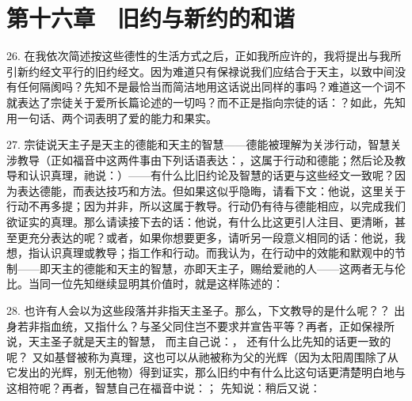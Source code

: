 
\section{第十六章　旧约与新约的和谐}

26. 在我依次简述按这些德性的生活方式之后，正如我所应许的，我将提出与我所引新约经文平行的旧约经文。因为难道只有保禄说我们应结合于天主，以致中间没有任何隔阂吗？先知不是最恰当而简洁地用这话说出同样的事吗？难道这一个词不就表达了宗徒关于爱所长篇论述的一切吗？而不正是指向宗徒的话：？如此，先知用一句话、两个词表明了爱的能力和果实。\par

27. 宗徒说天主子是天主的德能和天主的智慧——德能被理解为关涉行动，智慧关涉教导（正如福音中这两件事由下列话语表达：，这属于行动和德能；然后论及教导和认识真理，祂说：）——有什么比旧约论及智慧的话更与这些经文一致呢？因为表达德能，而表达技巧和方法。但如果这似乎隐晦，请看下文：他说，这里关于行动不再多提；因为并非，所以这属于教导。行动仍有待与德能相应，以完成我们欲证实的真理。那么请读接下去的话：他说，有什么比这更引人注目、更清晰，甚至更充分表达的呢？或者，如果你想要更多，请听另一段意义相同的话：他说，我想，指认识真理或教导；指工作和行动。而我认为，在行动中的效能和默观中的节制——即天主的德能和天主的智慧，亦即天主子，赐给爱祂的人——这两者无与伦比。当同一位先知继续显明其价值时，就是这样陈述的：\par

28. 也许有人会以为这些段落并非指天主圣子。那么，下文教导的是什么呢？？ 出身若非指血统，又指什么？与圣父同住岂不要求并宣告平等？再者，正如保禄所说，天主圣子就是天主的智慧， 而主自己说：， 还有什么比先知的话更一致的呢？ 又如基督被称为真理，这也可以从祂被称为父的光辉（因为太阳周围除了从它发出的光辉，别无他物）得到证实，那么旧约中有什么比这句话更清楚明白地与这相符呢？再者，智慧自己在福音中说：； 先知说：稍后又说：\par

